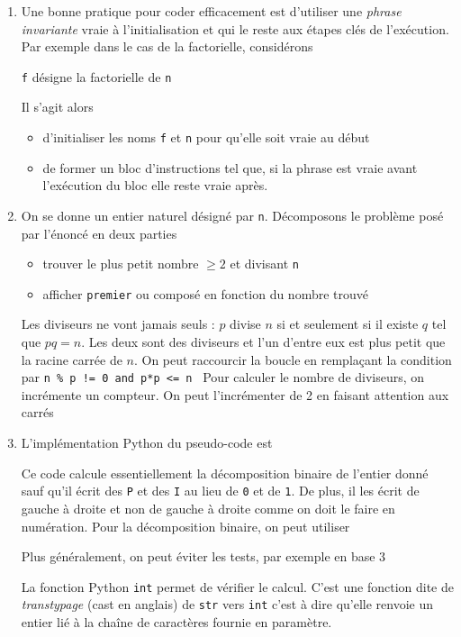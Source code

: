 \begin{enumerate}
  \item Une bonne pratique pour coder efficacement est d'utiliser une \emph{phrase invariante} vraie à l'initialisation et qui le reste aux étapes clés de l'exécution. Par exemple dans le cas de la factorielle, considérons 
\begin{center}
  \og \texttt{f} désigne la factorielle de \texttt{n} \fg
\end{center}
Il s'agit alors
\begin{itemize}
  \item d'initialiser les noms \texttt{f} et \texttt{n} pour qu'elle soit vraie au début
  \item de former un bloc d'instructions tel que, si la phrase est vraie avant l'exécution du bloc elle reste vraie après.
\end{itemize}


\item On se donne un entier naturel désigné par \texttt{n}. Décomposons le problème posé par l'énoncé en deux parties
\begin{itemize}
  \item trouver le plus petit nombre $\geq 2$ et divisant \texttt{n}
  \item afficher \texttt{premier} ou composé en fonction du nombre trouvé
\end{itemize}

Les diviseurs ne vont jamais seuls : $p$ divise $n$ si et seulement si il existe $q$ tel que $pq=n$. Les deux sont des diviseurs et l'un d'entre eux est plus petit que la racine carrée de $n$. 
On peut raccourcir la boucle en remplaçant la condition par \texttt{n \% p != 0 and p*p <= n }\newline
Pour calculer le nombre de diviseurs, on incrémente un compteur. On peut l'incrémenter de 2 en faisant attention aux carrés


\item L'implémentation Python du pseudo-code est

Ce code calcule essentiellement la décomposition binaire de l'entier donné sauf qu'il écrit des \texttt{P} et des \texttt{I} au lieu de \texttt{0} et de \texttt{1}. De plus, il les écrit de gauche à droite et non de gauche à droite comme on doit le faire en numération. Pour la décomposition binaire, on peut utiliser

Plus généralement, on peut éviter les tests, par exemple en base 3

La fonction Python \texttt{int} permet de vérifier le calcul. C'est une fonction dite de \emph{transtypage} (cast en anglais) de \texttt{str} vers \texttt{int} c'est à dire qu'elle renvoie un entier lié à la chaîne de caractères fournie en paramètre. 


\end{enumerate}

